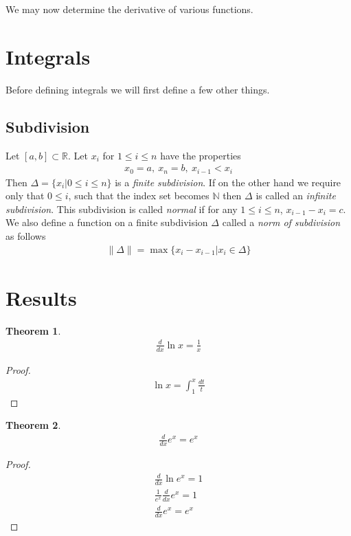 \documentclass{article}
\newtheorem{theorem}{Theorem}[section]
\begin{document}
We may now determine the derivative of various functions.
\section{Integrals}
Before defining integrals we will first define a few other things.

\subsection{Subdivision}
Let $[a,b] \subset \mathbb{R}$. Let $x_i$ for $1 \leq i \leq n$ have the
properties
\begin{align}
	x_0 = a,\ x_n = b,\ x_{i-1} < x_i
\end{align}
Then $\Delta = \{x_i|0 \leq i \leq n\}$ is a \textit{finite subdivision}. If on
the other hand we require only that $0 \leq i$, such that the index set becomes
$\mathbb{N}$ then $\Delta$ is called an \textit{infinite subdivision}. This
subdivision is called \textit{normal} if for any $1 \leq i \leq n$, 
$x_{i-1}-x_i = c$. We also define a function on a finite subdivision 
$\Delta$ called a \textit{norm of subdivision} as follows
\begin{align}
	\|\Delta \| = \max \{x_{i}-x_{i-1}|x_i \in \Delta\}
\end{align}

\section{Results}

\begin{theorem}
\begin{align}
    \frac{d}{dx} \ln x= \frac{1}{x}
\end{align}
\end{theorem}
\begin{proof}
\begin{align}
    \ln x = \int_1^x \frac{dt}{t}
    
\end{align}
\end{proof}


\begin{theorem}
\begin{align}
    \frac{d}{dx} e^x =e^x
\end{align}
\end{theorem}
\begin{proof}
\begin{align}
    \frac{d}{dx} \ln e^x = 1 \\ \nonumber
    \frac{1}{e^x} \frac{d}{dx} e^x = 1 \\ \nonumber
    \frac{d}{dx} e^x =e^x 
\end{align}
\end{proof}
\end{document}

